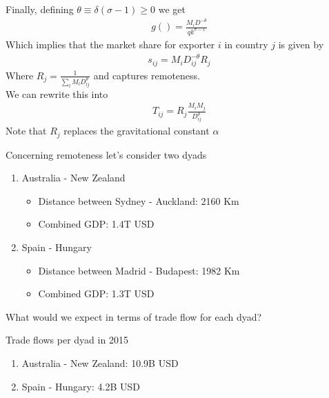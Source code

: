 \documentclass{beamer}
\begin{document}
\begin{frame}
  Finally, defining $\theta \equiv \delta (\sigma-1) \geq 0$ we get
  \begin{align*}
    g()= \frac{M_iD^{-\theta}}{qk^{\sigma-1}}
  \end{align*}
  \medskip
  Which implies that the market share for exporter $i$ in country $j$ is given by
  \begin{align*}
    s_{ij} = M_iD_{ij}^{-\theta}R_j
  \end{align*}
  \medskip 
  Where $R_j = \frac{1}{\sum_l M_l D_{lj}^\theta}$ and captures remoteness.\\ 
  We can rewrite this into
  \begin{align*}
    T_{ij} = R_j \frac{M_i M_j}{D_{ij}^\theta}
  \end{align*}
  Note that $R_j$ replaces the gravitational constant $\alpha$
\end{frame}

\begin{frame}
  Concerning remoteness let's consider two dyads
  \medskip
  \begin{enumerate}
    \item Australia - New Zealand
    \begin{itemize}
      \item Distance between Sydney - Auckland: 2160 Km
      \item Combined GDP: 1.4T USD
    \end{itemize}
    \medskip
    \item Spain - Hungary
    \begin{itemize}
      \item Distance between Madrid - Budapest: 1982 Km
      \item Combined GDP: 1.3T USD
    \end{itemize}
  \end{enumerate}
  \medskip  
  What would we expect in terms of trade flow for each dyad?
\end{frame}

\begin{frame}
  Trade flows per dyad in 2015
  \begin{enumerate}
    \item Australia - New Zealand: 10.9B USD
    \item Spain - Hungary: 4.2B USD
  \end{enumerate}  
\end{frame}
\end{document}
